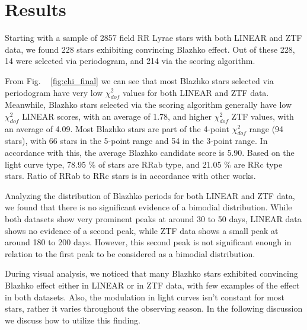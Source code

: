 

\section{Results}\label{sec:results}

Starting with a sample of 2857 field RR Lyrae stars with both LINEAR and ZTF data, we found 228 stars exhibiting
convincing Blazhko effect. Out of these 228, 14 were selected via periodogram, and 214 via the scoring algorithm. 

From Fig. ~ \ref{fig:chi_final} we can see that most Blazhko stars selected via periodogram have very low $\chi^2_{dof}$ values for both 
LINEAR and ZTF data. Meanwhile, Blazhko stars selected via the scoring algorithm generally have low $\chi^2_{dof}$ LINEAR scores, with an average of 1.78, and higher $\chi^2_{dof}$ ZTF values,
with an average of 4.09. Most Blazhko stars are part of the 4-point $\chi^2_{dof}$ range (94 stars), with 66 stars in the 5-point range and 54 in the 3-point range. In accordance with this, the
average Blazhko candidate score is 5.90. Based on the light curve type, 78.95 \% of stars are RRab type, and 21.05 \% are RRc type stars. Ratio of RRab to RRc stars is in accordance with other works.

Analyzing the distribution of Blazhko periods for both LINEAR and ZTF data, we found that there is no significant evidence of a bimodial distribution. While both datasets show very prominent peaks at 
around 30 to 50 days, LINEAR data shows no evidence of a second peak, while ZTF data shows a small peak at around 180 to 200 days. However, this second peak is not significant enough in relation to 
the first peak to be considered as a bimodial distribution. 

During visual analysis, we noticed that many Blazhko stars exhibited convincing Blazhko effect either in LINEAR or in ZTF data, with few examples of the effect in both datasets. 
Also, the modulation in light curves isn't constant for most stars, rather it varies throughout the observing season. In the following discussion we discuss how to utilize this finding.

